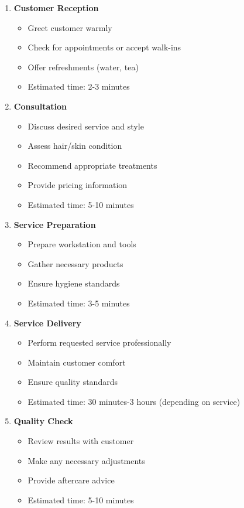 \begin{enumerate}[leftmargin=2em]
    \item \textbf{Customer Reception}
    \begin{itemize}
        \item Greet customer warmly
        \item Check for appointments or accept walk-ins
        \item Offer refreshments (water, tea)
        \item Estimated time: 2-3 minutes
    \end{itemize}
    
    \item \textbf{Consultation}
    \begin{itemize}
        \item Discuss desired service and style
        \item Assess hair/skin condition
        \item Recommend appropriate treatments
        \item Provide pricing information
        \item Estimated time: 5-10 minutes
    \end{itemize}
    
    \item \textbf{Service Preparation}
    \begin{itemize}
        \item Prepare workstation and tools
        \item Gather necessary products
        \item Ensure hygiene standards
        \item Estimated time: 3-5 minutes
    \end{itemize}
    
    \item \textbf{Service Delivery}
    \begin{itemize}
        \item Perform requested service professionally
        \item Maintain customer comfort
        \item Ensure quality standards
        \item Estimated time: 30 minutes-3 hours (depending on service)
    \end{itemize}
    
    \item \textbf{Quality Check}
    \begin{itemize}
        \item Review results with customer
        \item Make any necessary adjustments
        \item Provide aftercare advice
        \item Estimated time: 5-10 minutes
    \end{itemize}
    

\end{enumerate}
